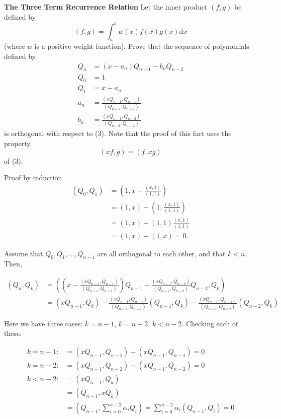 \textbf{The Three Term Recurrence Relation} Let the inner product
$(f,g)$ be defined by \[(f,g) = \int_a^b w(x) f(x) g(x) \mathrm{d}x\]
(where $w$ is a positive weight function). Prove that the sequence of
polynomials defined by
\[
\begin{aligned}
Q_n &= (x - a_n) Q_{n-1} - b_n Q_{n-2} \\
Q_0 &= 1 \\
Q_1 &= x - a_n \\
a_n &= \frac{(x Q_{n-1}, Q_{n-1})}{(Q_{n-1}, Q_{n-1})} \\
b_n &= \frac{(x Q_{n-1}, Q_{n-2})}{(Q_{n-2}, Q_{n-2})}
\end{aligned}
\]
is orthogonal with respect to (3). Note that the proof of this fact
uses the property \[(xf, g) = (f, xg)\] of (3).

{\color{blue}

Proof by induction
\[
\begin{aligned}
(Q_0, Q_1) &= (1, x - \frac{(x, 1)}{(1,1)}) \\
           &= (1,x) - (1, \frac{(x,1)}{(1,1)}) \\
           &= (1,x) - (1,1) \frac{(x,1)}{(1,1)} \\
           &= (1,x) - (1,x) = 0.
\end{aligned}
\]

Assume that $Q_0, Q_1, \dots, Q_{n-1}$ are all orthogonal to each
other, and that $k<n$. Then,

\[
\begin{aligned}
(Q_n, Q_k) &= \left( \left( x - \frac{(x Q_{n-1}, Q_{n-1})}{(Q_{n-1},
Q_{n-1})} \right) Q_{n-1} - \frac{(x Q_{n-1}, Q_{n-2})}{(Q_{n-2},
Q_{n-2})} Q_{n-2}, Q_k \right) \\
&= (x Q_{n-1}, Q_k) - \frac{(x Q_{n-1}, Q_{n-1})}{(Q_{n-1}, Q_{n-1})}
(Q_{n-1}, Q_k) - \frac{(x Q_{n-1}, Q_{n-2})}{(Q_{n-2}, Q_{n-2})}
(Q_{n-2}, Q_k)
\end{aligned}
\]

Here we have three cases: $k = n-1$, $k = n-2$, $k < n-2$. Checking
each of these,

\[
\begin{aligned}
k = n-1: &= (x Q_{n-1}, Q_{n-1}) - (x Q_{n-1}, Q_{n-1}) = 0 \\
k = n-2: &= (x Q_{n-1}, Q_{n-2}) - (x Q_{n-1}, Q_{n-2}) = 0 \\
k < n-2: &= (x Q_{n-1}, Q_k) \\
&= (Q_{n-1}, x Q_k) \\
&= \left(Q_{n-1}, \sum_{i=0}^{n-2} \alpha_i Q_i\right)
= \sum_{i=0}^{n-2} \alpha_i (Q_{n-1}, Q_i) = 0
\end{aligned}
\]


}
